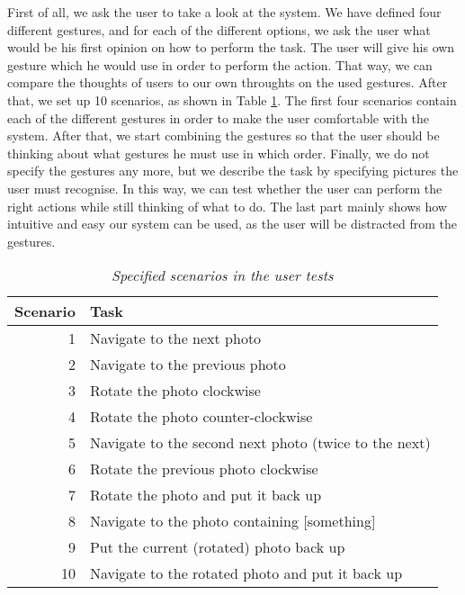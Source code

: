 \documentclass[11pt,a4paper]{article}
\begin{document}
First of all, we ask the user to take a look at the system. We have defined four different gestures, and for each of the different options, we ask the user what would be his first opinion on how to perform the task. The user will give his own gesture which he would use in order to perform the action. That way, we can compare the thoughts of users to our own throughts on the used gestures. After that, we set up 10 scenarios, as shown in Table \ref{tab:scen}. The first four scenarios contain each of the different gestures in order to make the user comfortable with the system. After that, we start combining the gestures so that the user should be thinking about what gestures he must use in which order. Finally, we do not specify the gestures any more, but we describe the task by specifying pictures the user must recognise. In this way, we can test whether the user can perform the right actions while still thinking of what to do. The last part mainly shows how intuitive and easy our system can be used, as the user will be distracted from the gestures. 

\begin{table}
\begin{center}
\begin{tabular}{r|l}
\textbf{Scenario} & \textbf{Task} \\
\hline
1 & Navigate to the next photo \\ 
2 & Navigate to the previous photo \\
3 & Rotate the photo clockwise \\
4 & Rotate the photo counter-clockwise \\
5 & Navigate to the second next photo (twice to the next)\\ 
6 & Rotate the previous photo clockwise \\
7 & Rotate the photo and put it back up \\
8 & Navigate to the photo containing [something] \\
9 & Put the current (rotated) photo back up \\
10 & Navigate to the rotated photo and put it back up \\
\end{tabular}
\end{center}
\caption{\textit{Specified scenarios in the user tests}}
\label{tab:scen}
\end{table}
\end{document}
